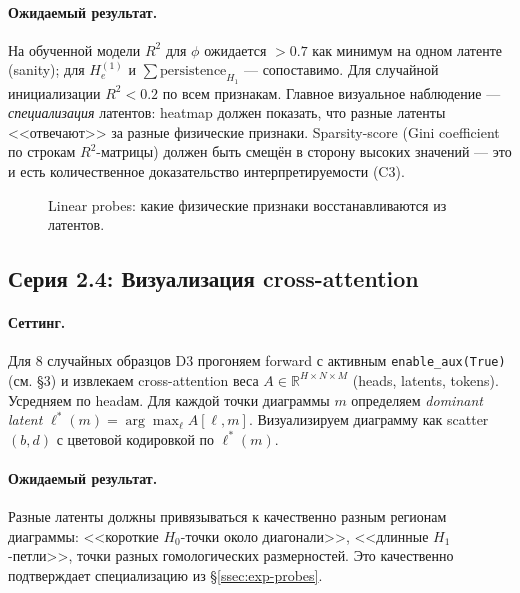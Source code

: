 \paragraph{Ожидаемый результат.} На обученной модели $R^2$ для $\phi$ ожидается $> 0.7$ как минимум на одном латенте (sanity); для $H_e^{(1)}$ и $\sum \text{persistence}_{H_1}$ --- сопоставимо. Для случайной инициализации $R^2 < 0.2$ по всем признакам. Главное визуальное наблюдение --- \emph{специализация} латентов: heatmap должен показать, что разные латенты <<отвечают>> за разные физические признаки. Sparsity-score (Gini coefficient по строкам $R^2$-матрицы) должен быть смещён в сторону высоких значений --- это и есть количественное доказательство интерпретируемости (C3).

\begin{figure}[ht]
\centering
{}
\caption{Linear probes: какие физические признаки восстанавливаются из латентов.}
\label{fig:probe-heatmap}
\end{figure}

\subsection{Серия 2.4: Визуализация cross-attention}
\label{ssec:exp-crossattn}

\paragraph{Сеттинг.} Для $8$ случайных образцов D3 прогоняем forward с активным \texttt{enable\_aux(True)} (см. §3) и извлекаем cross-attention веса $A \in \mathbb{R}^{H \times N \times M}$ (heads, latents, tokens). Усредняем по headам. Для каждой точки диаграммы $m$ определяем \emph{dominant latent} $\ell^*(m) = \arg\max_\ell A[\ell, m]$. Визуализируем диаграмму как scatter $(b, d)$ с цветовой кодировкой по $\ell^*(m)$.

\paragraph{Ожидаемый результат.} Разные латенты должны привязываться к качественно разным регионам диаграммы: <<короткие $H_0$-точки около диагонали>>, <<длинные $H_1$-петли>>, точки разных гомологических размерностей. Это качественно подтверждает специализацию из §\ref{ssec:exp-probes}.

